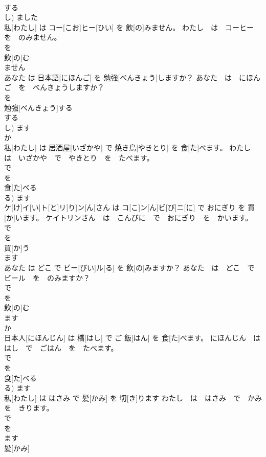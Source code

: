 \documentclass[8pt]{extreport}
\begin{document}
\begin{CJK}{UTF8}{min}
\\	する 
\\	し)	ました 
\\	私[わたし] は コー[こお]ヒー[ひい] を 飲[の]みません。	わたし　は　コーヒー　を　のみません。	
\\	を 
\\	飲[の]む 
\\	ません 
\\	あなた は 日本語[にほんご] を 勉強[べんきょう]しますか？	あなた　は　にほんご　を　べんきょうしますか？	
\\	を 
\\	勉強[べんきょう]する 
\\	する 
\\	し)	ます 
\\	か 
\\	私[わたし] は 居酒屋[いざかや] で 焼き鳥[やきとり] を 食[た]べます。	わたし　は　いざかや　で　やきとり　を　たべます。	
\\	で 
\\	を 
\\	食[た]べる 
\\	る)	ます 
\\	ケ[け]イ[い]ト[と]リ[り]ン[ん]さん は コ[こ]ン[ん]ビ[び]ニ[に] で おにぎり を 買[か]います。	ケイトリンさん　は　こんびに　で　おにぎり　を　かいます。	
\\	で 
\\	を 
\\	買[か]う 
\\	ます 
\\	あなた は どこ で ビー[びい]ル[る] を 飲[の]みますか？	あなた　は　どこ　で　ビール　を　のみますか？	
\\	で 
\\	を 
\\	飲[の]む 
\\	ます 
\\	か 
\\	日本人[にほんじん] は 橋[はし] で ご 飯[はん] を 食[た]べます。	にほんじん　は　はし　で　ごはん　を　たべます。	
\\	で 
\\	を 
\\	食[た]べる 
\\	る)	ます 
\\	私[わたし] は はさみ で 髪[かみ] を 切[き]ります	わたし　は　はさみ　で　かみ　を　きります。	
\\	で 
\\	を 
\\	ます 
\\	髪[かみ] 

\end{CJK}
\end{document}
